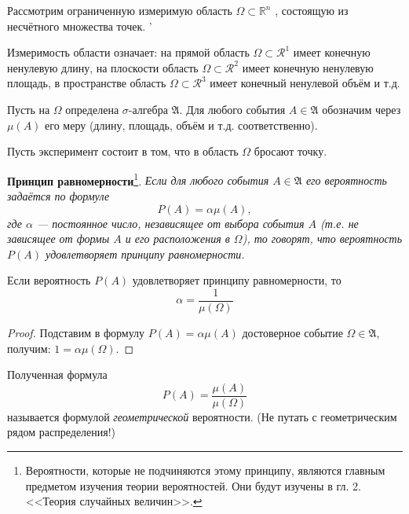 Рассмотрим ограниченную измеримую область $\Omega \subset \mathbb{R}^n$ , состоящую из несчётного множества точек. '

Измеримость области означает: на прямой область $\Omega \subset \mathcal{R}^1$ имеет конечную ненулевую длину, на плоскости область $\Omega \subset \mathcal{R}^2$ имеет конечную ненулевую площадь, в пространстве область $\Omega \subset \mathcal{R}^3$ имеет конечный ненулевой объём и т.д. 

Пусть на $\Omega$ определена $\sigma$-алгебра $\mathfrak{A}$. Для любого события $A \in \mathfrak{A}$ обозначим через $\mu(A)$ его меру (длину, площадь, объём и т.д. соответственно). 

Пусть эксперимент состоит в том, что в область $\Omega$ бросают точку.

\textbf{Принцип равномерности}\footnote{
Вероятности, которые не подчиняются этому принципу, являются главным предметом изучения теории вероятностей. Они будут изучены в гл. 2. <<Теория случайных величин>>.	
}. 
\textit{Если для любого события $A \in \mathfrak{A}$ его вероятность задаётся по формуле
$$P(A) = \alpha \mu(A),$$
где $\alpha$ — постоянное число, независящее от выбора события $A$ (т.е. не зависящее от формы $A$ и его расположения в $\Omega$), то говорят, что вероятность $P(A)$ удовлетворяет принципу равномерности.}

\begin{lemma}
Если вероятность $P(A)$ удовлетворяет принципу равномерности, то
$$\alpha=\frac{1}{\mu(\Omega)}$$
\end{lemma}

\begin{proof}
	Подставим в формулу $P(A) = \alpha \mu(A)$ достоверное событие $\Omega \in \mathfrak{A}$, получим: $1 = \alpha\mu(\Omega).$
\end{proof} 

\begin{definition}
Полученная формула
$$P(A) = \frac{\mu(A)}{\mu(\Omega)}$$
называется формулой \textit{геометрической} вероятности. (Не путать с геометрическим рядом распределения!)
\end{definition}

